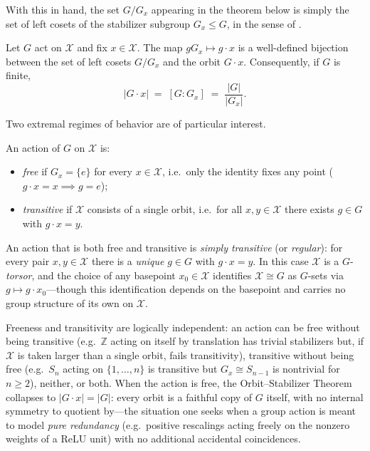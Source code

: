 \documentclass[mathematics,review,submit,moreauthors]{Definitions/mdpi}
\begin{document}
With this in hand, the set $G/G_x$ appearing in the theorem below is simply
the set of left cosets of the stabilizer subgroup $G_x \leq G$, in the sense
of .

\begin{Theorem}
\label{thm:orbit-stabilizer}
Let $G$ act on $\mathcal{X}$ and fix $x \in \mathcal{X}$. The map $g G_x \mapsto g \cdot x$ is a
well-defined bijection between the set of left cosets $G / G_x$ and the
orbit $G \cdot x$. Consequently, if $G$ is finite,
\[
    |G \cdot x| \;=\; [G : G_x] \;=\; \frac{|G|}{|G_x|}.
\]
\end{Theorem}

Two extremal regimes of behavior are of particular interest.

\begin{Definition}
\label{def:free-transitive}
An action of $G$ on $\mathcal{X}$ is:
\begin{itemize}
    \item \emph{free} if $G_x = \{e\}$ for every $x \in \mathcal{X}$, i.e.\ only the
    identity fixes any point ($g \cdot x = x \implies g = e$);
    \item \emph{transitive} if $\mathcal{X}$ consists of a single orbit, i.e.\ for all
    $x, y \in \mathcal{X}$ there exists $g \in G$ with $g \cdot x = y$.
\end{itemize}
An action that is both free and transitive is \emph{simply transitive} (or
\emph{regular}): for every pair $x, y \in \mathcal{X}$ there is a \emph{unique}
$g \in G$ with $g \cdot x = y$. In this case $\mathcal{X}$ is a $G$-\emph{torsor}, and
the choice of any basepoint $x_0 \in \mathcal{X}$ identifies $\mathcal{X} \cong G$ as $G$-sets via
$g \mapsto g \cdot x_0$---though this identification depends on the
basepoint and carries no group structure of its own on $\mathcal{X}$.
\end{Definition}

Freeness and transitivity are logically independent: an action can be free
without being transitive (e.g.\ $\mathbb{Z}$ acting on itself by translation
has trivial stabilizers but, if $\mathcal{X}$ is taken larger than a single orbit,
fails transitivity), transitive without being free (e.g.\ $S_n$ acting on
$\{1,\dots,n\}$ is transitive but $G_x \cong S_{n-1}$ is nontrivial for
$n \geq 2$), neither, or both. When the action is free, the Orbit--Stabilizer
Theorem collapses to $|G \cdot x| = |G|$: every orbit is a faithful copy of
$G$ itself, with no internal symmetry to quotient by---the situation one
seeks when a group action is meant to model \emph{pure redundancy} (e.g.\
positive rescalings acting freely on the nonzero weights of a ReLU unit) with
no additional accidental coincidences.
\end{document}
